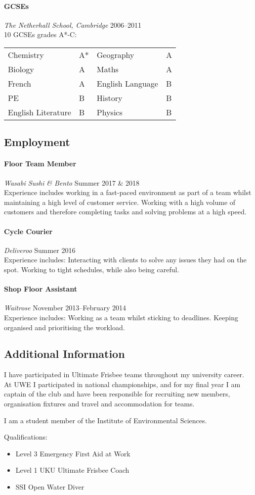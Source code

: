 \documentclass[11pt,a4paper]{article}
\newcommand{\centry}[3]{\paragraph{#1} \textit{#2}%
\hfill#3\\[2pt]}
\begin{document}
\centry{GCSEs}{The Netherhall School, Cambridge}{2006--2011} 
10 GCSEs grades A*-C:
\begin{center}
  \begin{tabular}{llll}
    Chemistry & A* & Geography & A \\
    Biology& A & Maths& A \\
    French& A & English Language& B \\
    PE& B &  History& B\\
    English Literature& B & Physics& B\\
  \end{tabular}
\end{center}

\subsection*{Employment}

\centry{Floor Team Member}{Wasabi Sushi \& Bento}{Summer 2017 \& 2018}

Experience includes working in a fast-paced environment as part of a team whilst 
maintaining a high level of customer service. Working with a high volume of 
customers and therefore completing tasks and solving problems at a high speed. 

\centry{Cycle Courier}{Deliveroo}{Summer 2016}

Experience includes: Interacting with clients to solve any issues they had on 
the spot. Working to tight schedules, while also being careful. 


\centry{Shop Floor Assistant}{Waitrose}{November 2013--February 2014}

Experience includes: Working as a team whilst sticking to deadlines. 
Keeping organised and prioritising the workload.

\subsection*{Additional Information}

I have participated in Ultimate Frisbee teams throughout my university
career. At UWE I participated in national championships, and for my final year
I am captain of the club and have been responsible for recruiting new members,
organisation fixtures and travel and accommodation for teams.

I am a student member of the Institute of Environmental Sciences.

Qualifications:
\begin{itemize}
  \item Level 3 Emergency First Aid at Work    
  \item Level 1 UKU Ultimate Frisbee Coach
  \item SSI Open Water Diver
\end{itemize}
\end{document}

